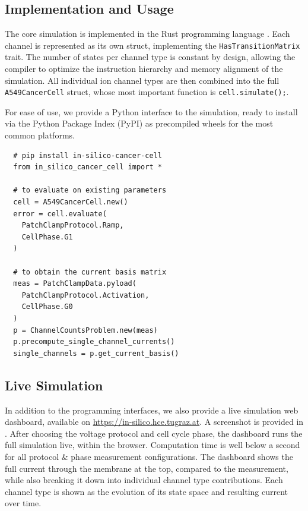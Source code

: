 \subsection{Implementation and Usage}
The core simulation is implemented in the Rust programming language \cite{2014-rust}.
Each channel is represented as its own struct, implementing the \texttt{HasTransitionMatrix} trait.
The number of states per channel type is constant by design, allowing the compiler to optimize the instruction hierarchy and memory alignment of the simulation.
All individual ion channel types are then combined into the full \texttt{A549CancerCell} struct, whose most important function is \texttt{cell.simulate();}.

For ease of use, we provide a Python interface to the simulation, ready to install via the Python Package Index (PyPI) as precompiled wheels for the most common platforms.

\begin{verbatim}
  # pip install in-silico-cancer-cell
  from in_silico_cancer_cell import *

  # to evaluate on existing parameters
  cell = A549CancerCell.new()
  error = cell.evaluate(
    PatchClampProtocol.Ramp,
    CellPhase.G1
  )

  # to obtain the current basis matrix
  meas = PatchClampData.pyload(
    PatchClampProtocol.Activation,
    CellPhase.G0
  )
  p = ChannelCountsProblem.new(meas)
  p.precompute_single_channel_currents()
  single_channels = p.get_current_basis()
\end{verbatim}

\subsection{Live Simulation}
In addition to the programming interfaces, we also provide a live simulation web dashboard, available on \url{https://in-silico.hce.tugraz.at}. A screenshot is provided in .
After choosing the voltage protocol and cell cycle phase, the dashboard runs the full simulation live, within the browser.
Computation time is well below a second for all protocol \& phase measurement configurations.
The dashboard shows the full current through the membrane at the top, compared to the measurement, while also breaking it down into individual channel type contributions.
Each channel type is shown as the evolution of its state space and resulting current over time.

